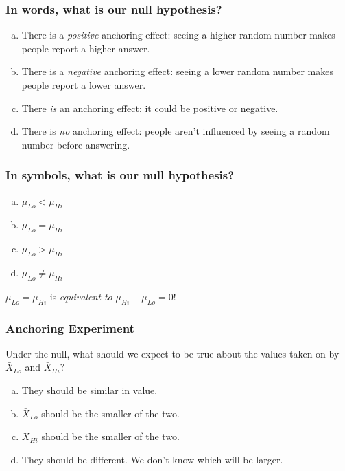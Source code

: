 \documentclass{beamer}
\begin{document}
\begin{frame}
	\frametitle{In words, what is our null hypothesis?\hfill }

	\begin{enumerate}[(a)]
		\item There is a \emph{positive} anchoring effect: seeing a higher random number makes people report a higher answer.
		\item There is a \emph{negative} anchoring effect: seeing a lower random number makes people report a lower answer. 
		\item There \emph{is} an anchoring effect: it could be positive or negative.
		\item There is  \emph{no} anchoring effect: people aren't influenced by seeing a random number before answering.
	\end{enumerate}
\end{frame}
\begin{frame}
	\frametitle{In symbols, what is our null hypothesis?}

	\begin{enumerate}[(a)]
		\item $\mu_{Lo} < \mu_{Hi}$
		\item $\mu_{Lo} = \mu_{Hi}$
		\item $\mu_{Lo} > \mu_{Hi}$
		\item $\mu_{Lo} \neq \mu_{Hi}$
	\end{enumerate}
\pause
	\vspace{1em}

	\alert{$\mu_{Lo} = \mu_{Hi}$ is \emph{equivalent to} $\mu_{Hi} - \mu_{Lo} = 0$!}
\end{frame}
\begin{frame}
	\frametitle{Anchoring Experiment}
 
Under the null, what should we expect to be true about the values taken on by $\bar{X}_{Lo}$ and $\bar{X}_{Hi}$?

\vspace{1em}

	\begin{enumerate}[(a)]
		\item They should be similar in value.
		\item $\bar{X}_{Lo}$ should be the smaller of the two.
		\item $\bar{X}_{Hi}$ should be the smaller of the two.
		\item They should be different. We don't know which will be larger.
	\end{enumerate}
\end{frame}
\end{document}
